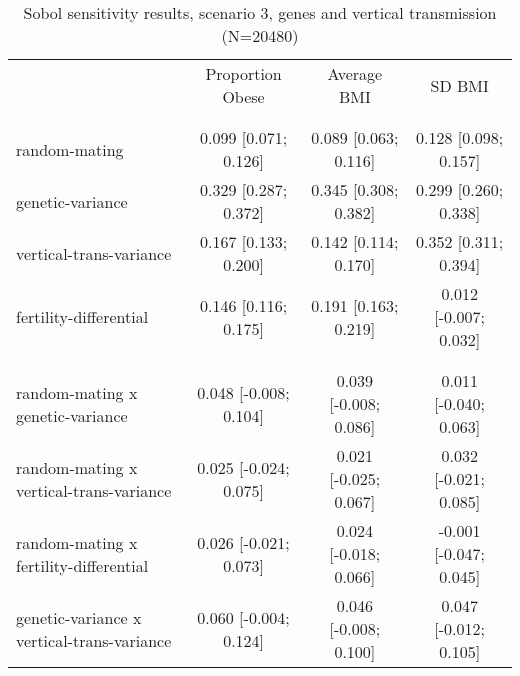 
    \begin{table}[htp]
    \renewcommand{\arraystretch}{1.3}
    \setlength{\tabcolsep}{2pt}
    \caption{Sobol sensitivity results, scenario 3, genes and vertical transmission (N=20480)}
    \label{tab:sobol-snp-vt}
    \footnotesize
    \centering
    \begin{threeparttable}
    \begin{tabular}{lccc}
    \hline
    \addlinespace
    & Proportion Obese & Average BMI & SD BMI \\
    \addlinespace
    \hline
    \addlinespace
    \multicolumn{4}{l}{\textbf{Scenario 3 (genes and vertical transmission)}} \\
    \addlinespace[6pt]
    \multicolumn{4}{l}{\hspace{1em} S1} \\
\hspace{1.5em} random-mating & 0.099 [0.071; 0.126]   & 0.089 [0.063; 0.116]   & 0.128 [0.098; 0.157] \\
	  \hspace{1.5em} genetic-variance & 0.329 [0.287; 0.372]   & 0.345 [0.308; 0.382]   & 0.299 [0.260; 0.338] \\
	  \hspace{1.5em} vertical-trans-variance & 0.167 [0.133; 0.200]   & 0.142 [0.114; 0.170]   & 0.352 [0.311; 0.394] \\
	  \hspace{1.5em} fertility-differential & 0.146 [0.116; 0.175]   & 0.191 [0.163; 0.219]   & 0.012 [-0.007; 0.032] \\
	 \\
    \addlinespace[12pt]
    \multicolumn{4}{l}{\hspace{1em} S2} \\ 
\hspace{1.5em} random-mating x genetic-variance & 0.048 [-0.008; 0.104]   & 0.039 [-0.008; 0.086]   & 0.011 [-0.040; 0.063] \\
	  \hspace{1.5em} random-mating x vertical-trans-variance & 0.025 [-0.024; 0.075]   & 0.021 [-0.025; 0.067]   & 0.032 [-0.021; 0.085] \\
	  \hspace{1.5em} random-mating x fertility-differential & 0.026 [-0.021; 0.073]   & 0.024 [-0.018; 0.066]   & -0.001 [-0.047; 0.045] \\
	  \hspace{1.5em} genetic-variance x vertical-trans-variance & 0.060 [-0.004; 0.124]   & 0.046 [-0.008; 0.100]   & 0.047 [-0.012; 0.105] \\

\end{tabular}
\end{threeparttable}
\end{table}

